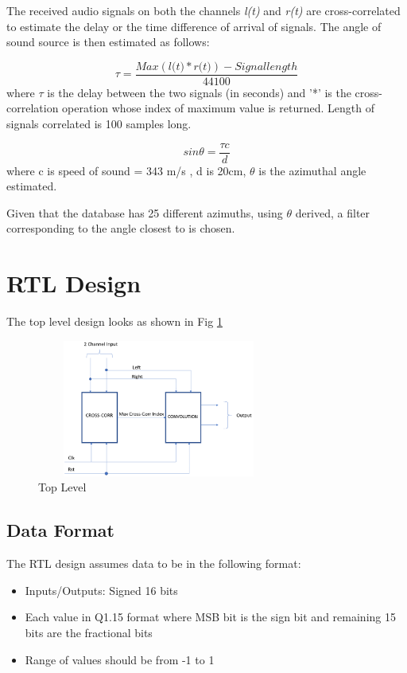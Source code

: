 \documentclass[conference]{IEEEtran}
\begin{document}
The received audio signals on both the channels \textit{l(t)} and \textit{r(t)} are cross-correlated to estimate the delay or the time difference of arrival of signals. The angle of sound source is then estimated as follows: 

\begin{equation}
\tau = \frac{Max(\textit{l(t)} * \textit{r(t)}) - Signal length}{44100} 
\label{tdelay}
\end{equation}
where $\tau$ is the delay between the two signals (in seconds) and '*' is the cross-correlation operation whose index of maximum value is returned. Length of signals correlated is 100 samples long. 

\begin{equation}
sin\theta = \frac{\tau c}{d}
\label{angle}
\end{equation}
where c is speed of sound = 343 m/s , d is 20cm, $\theta$ is the azimuthal angle estimated.

Given that the database has 25 different azimuths, using $\theta$ derived, a filter corresponding to the angle closest to is chosen.         

\section{RTL Design}
The top level design looks as shown in Fig \ref{fig:top_level}

\begin{figure}
    \centering
    \includegraphics[width = 8cm, height = 4.5cm]{overall_design.png}
    \caption{Top Level}
    \label{fig:top_level}
\end{figure}

\subsection{Data Format}
The RTL design assumes data to be in the following format: 
\begin{itemize}
    \item Inputs/Outputs: Signed 16 bits 
    \item Each value in Q1.15 format where MSB bit is the sign bit and remaining 15 bits are the fractional bits
    \item Range of values should be from -1 to 1 
\end{itemize}
\end{document}
